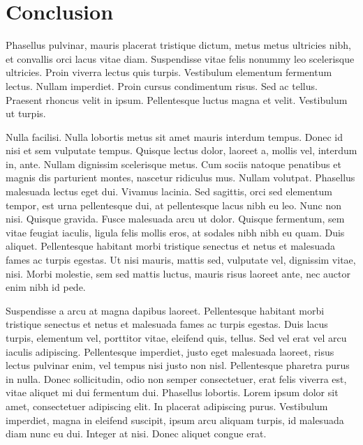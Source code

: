 \documentclass[a4paper,11pt,oneside]{report}
\begin{document}
\chapter{Conclusion}
Phasellus pulvinar, mauris placerat tristique dictum, metus metus ultricies
nibh, et convallis orci lacus vitae diam. Suspendisse vitae felis nonummy leo
scelerisque ultricies. Proin viverra lectus quis turpis. Vestibulum elementum
fermentum lectus. Nullam imperdiet. Proin cursus condimentum risus. Sed ac
tellus. Praesent rhoncus velit in ipsum. Pellentesque luctus magna et velit.
Vestibulum ut turpis.

Nulla facilisi. Nulla lobortis metus sit amet mauris interdum tempus. Donec id
nisi et sem vulputate tempus. Quisque lectus dolor, laoreet a, mollis vel,
interdum in, ante. Nullam dignissim scelerisque metus. Cum sociis natoque
penatibus et magnis dis parturient montes, nascetur ridiculus mus. Nullam
volutpat. Phasellus malesuada lectus eget dui. Vivamus lacinia. Sed sagittis,
orci sed elementum tempor, est urna pellentesque dui, at pellentesque lacus nibh
eu leo. Nunc non nisi. Quisque gravida. Fusce malesuada arcu ut dolor. Quisque
fermentum, sem vitae feugiat iaculis, ligula felis mollis eros, at sodales nibh
nibh eu quam. Duis aliquet. Pellentesque habitant morbi tristique senectus et
netus et malesuada fames ac turpis egestas. Ut nisi mauris, mattis sed,
vulputate vel, dignissim vitae, nisi. Morbi molestie, sem sed mattis luctus,
mauris risus laoreet ante, nec auctor enim nibh id pede.

Suspendisse a arcu at magna dapibus laoreet. Pellentesque habitant morbi
tristique senectus et netus et malesuada fames ac turpis egestas. Duis lacus
turpis, elementum vel, porttitor vitae, eleifend quis, tellus. Sed vel erat vel
arcu iaculis adipiscing. Pellentesque imperdiet, justo eget malesuada laoreet,
risus lectus pulvinar enim, vel tempus nisi justo non nisl. Pellentesque
pharetra purus in nulla. Donec sollicitudin, odio non semper consectetuer, erat
felis viverra est, vitae aliquet mi dui fermentum dui. Phasellus lobortis. Lorem
ipsum dolor sit amet, consectetuer adipiscing elit. In placerat adipiscing
purus. Vestibulum imperdiet, magna in eleifend suscipit, ipsum arcu aliquam
turpis, id malesuada diam nunc eu dui. Integer at nisi. Donec aliquet congue
erat.



\cleardoublepage
{}


\nocite{*}



%
\end{document}
